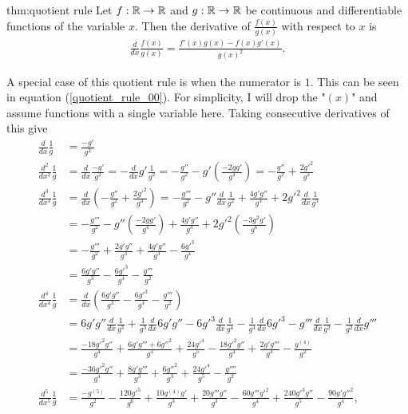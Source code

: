 \begin{theo}{thm:quotient rule}
	Let $f:{\mathbb R} \to {\mathbb R}$ and $g: {\mathbb R}\to{\mathbb R}$ be continuous and differentiable functions of the variable $x$. Then the derivative of $\frac{f(x)}{g(x)}$ with respect to $x$ is
	\begin{align}
		\frac{d}{dx} \frac{f(x)}{g(x)} = \frac{f'(x)g(x)-f(x)g'(x)}{g(x)^2}.
	\end{align}
\end{theo}
A special case of this quotient rule is when the numerator is $1$. This can be seen in equation (\ref{quotient_rule_00}). For simplicity, I will drop the "$(x)$" and assume functions with a single variable here. Taking consecutive derivatives of this give
\begin{align}
	\frac{d}{dx}\frac{1}{g} &= \frac{-g'}{g^2} \label{d/dx 1/g 1}\\
	\frac{d^2}{dx^2}\frac{1}{g} &= \frac{d}{dx}\frac{-g'}{g^2} = -\frac{d}{dx}g'\frac{1}{g^2} = -\frac{g''}{g^2}-g'\left(\frac{-2gg'}{g^4}\right) = -\frac{g''}{g^2}+\frac{2g'^2}{g^3} \label{d/dx 1/g 2}\\
	\frac{d^3}{dx^3}\frac{1}{g} &= \frac{d}{dx}\left(-\frac{g''}{g^2}+\frac{2g'^2}{g^3}\right) =- \frac{g'''}{g^2} - g''\frac{d}{dx}\frac{1}{g^2} +  \frac{4g'g''}{g^3} + 2g'^2\frac{d}{dx}\frac{1}{g^3}  \nonumber \\&= -\frac{g'''}{g^2}-g''\left(\frac{-2gg'}{g^4}\right)+\frac{4g'g''}{g^3}+2g'^2\left(\frac{-3g^2g'}{g^6}\right) \nonumber\\
	&= -\frac{g'''}{g^2}+\frac{2g'g''}{g^3}+\frac{4g'g''}{g^3}-\frac{6g'^3}{g^4} \nonumber\\
	&=\frac{6g'g''}{g^3}-\frac{6g'^3}{g^4}-\frac{g'''}{g^2} \\
	\frac{d^4}{dx^4}\frac{1}{g} &= \frac{d}{dx}\left(\frac{6g'g''}{g^3}-\frac{6g'^3}{g^4}-\frac{g'''}{g^2}\right) \nonumber \\
	&= 6g'g''\frac{d}{dx}\frac{1}{g^3}+\frac{1}{g^3}\frac{d}{dx}6g'g''-6g'^3\frac{d}{dx}\frac{1}{g^4}-\frac{1}{g^4}\frac{d}{dx}6g'^3-g'''\frac{d}{dx}\frac{1}{g^2}-\frac{1}{g^2}\frac{d}{dx}g'''\nonumber \\
	&= \frac{-18g'^2g''}{g^4}+\frac{6g'g'''+6g''^2}{g^3}+\frac{24g'^4}{g^5}-\frac{18g'^2g''}{g^4}+\frac{2g'g'''}{g^3}-\frac{g^{(4)}}{g^2}\nonumber \\
	&= \frac{-36g'^2g''}{g^4}+\frac{8g'g'''}{g^3}+\frac{6g''^2}{g^3}+\frac{24g'^4}{g^5}-\frac{g''''}{g^2} \\
	\frac{d^5}{dx^5}\frac{1}{g} &= \frac{-g^{(5)}}{g^2}-\frac{120g'^5}{g^6}+\frac{10g^{(4)}g'}{g^3}+\frac{20g'''g''}{g^3}-\frac{60g'''g'^2}{g^4}+\frac{240g'^3g''}{g^5}-\frac{90g'g''^2}{g^4},\label{d/dx 1/g 5}
\end{align}
